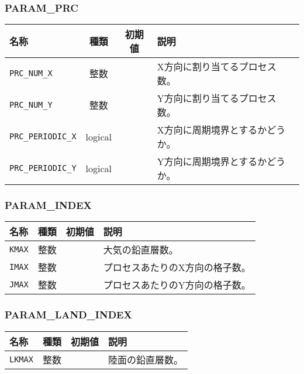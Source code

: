 \subsubsection{PARAM\_PRC}
\begin{tabularx}{150mm}{|l|c|c|X|} \hline
 \rowcolor[gray]{0.9} 名称 & 種類 & 初期値 & 説明 \\ \hline
 \verb|PRC_NUM_X| & 整数 &  & X方向に割り当てるプロセス数。 \\ \hline
 \verb|PRC_NUM_Y| & 整数 &  & Y方向に割り当てるプロセス数。 \\ \hline
 \verb|PRC_PERIODIC_X| & logical &  & X方向に周期境界とするかどうか。 \\ \hline
 \verb|PRC_PERIODIC_Y| & logical &  & Y方向に周期境界とするかどうか。 \\ \hline
\end{tabularx}


\subsubsection{PARAM\_INDEX}
\begin{tabularx}{150mm}{|l|c|c|X|} \hline
 \rowcolor[gray]{0.9} 名称 & 種類 & 初期値 & 説明 \\ \hline
 \verb|KMAX| & 整数 &  & 大気の鉛直層数。 \\ \hline
 \verb|IMAX| & 整数 &  & プロセスあたりのX方向の格子数。 \\ \hline
 \verb|JMAX| & 整数 &  & プロセスあたりのY方向の格子数。 \\ \hline
\end{tabularx}


\subsubsection{PARAM\_LAND\_INDEX}
\begin{tabularx}{150mm}{|l|c|c|X|} \hline
 \rowcolor[gray]{0.9} 名称 & 種類 & 初期値 & 説明 \\ \hline
 \verb|LKMAX| & 整数 &  & 陸面の鉛直層数。 \\ \hline
\end{tabularx}


